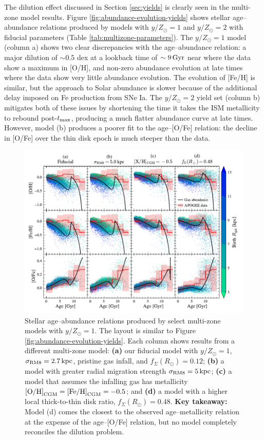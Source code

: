 \documentclass[twocolumn,twocolappendix,linenumbers]{aastex631}
\newcommand{\mathOH}{{\rm [O/H]}}
\newcommand{\mathFeH}{{\rm [Fe/H]}}
\newcommand{\yZ}[1]{$y/Z_\odot=#1$}
\begin{document}
The dilution effect discussed in Section \ref{sec:yields} is clearly seen in the multi-zone model results. Figure \ref{fig:abundance-evolution-yields} shows stellar age--abundance relations produced by models with \yZ{1} and \yZ{2} with fiducial parameters (Table \ref{tab:multizone-parameters}). The \yZ{1} model (column a) shows two clear discrepancies with the \citet{leung_variational_2023} age--abundance relation: a major dilution of $\sim0.5$ dex at a lookback time of $\sim9\,{\rm Gyr}$ near where the data show a maximum in [O/H], and non-zero abundance evolution at late times where the data show very little abundance evolution. The evolution of [Fe/H] is similar, but the approach to Solar abundance is slower because of the additional delay imposed on Fe production from SNe Ia. The \yZ{2} yield set (column b) mitigates both of these issues by shortening the time it takes the ISM metallicity to rebound post-$t_{\rm max}$, producing a much flatter abundance curve at late times. However, model (b) produces a poorer fit to the age--[O/Fe] relation: the decline in [O/Fe] over the thin disk epoch is much steeper than the data.

\begin{figure}
    \centering
    \includegraphics{figures/abundance_evolution_params.pdf}
    \caption{Stellar age--abundance relations produced by select multi-zone models with \yZ{1}. The layout is similar to Figure \ref{fig:abundance-evolution-yields}. Each column shows results from a different multi-zone model: {\bf (a)} our fiducial model with $y/Z_\odot=1$, $\sigma_{\rm RM8}=2.7\,{\rm kpc}$, pristine gas infall, and $f_\Sigma(R_\odot)=0.12$; {\bf (b)} a model with greater radial migration strength $\sigma_{\rm RM8}=5\,{\rm kpc}$; {\bf (c)} a model that assumes the infalling gas has metallicity $\mathOH_{\rm CGM}=\mathFeH_{\rm CGM}=-0.5$; and {\bf (d)} a model with a higher local thick-to-thin disk ratio, $f_\Sigma(R_\odot)=0.48$. {\bf Key takeaway:} Model (d) comes the closest to the observed age--metallicity relation at the expense of the age--[O/Fe] relation, but no model completely reconciles the dilution problem.}
    \label{fig:abundance-evolution-params}
\end{figure}
\end{document}
